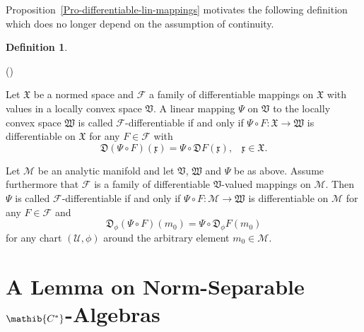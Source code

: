\documentclass[11pt,twoside,openright]{report}
\theoremstyle{definition}
\newtheorem{Def}{Definition}[chapter]
\theoremstyle{plain}
\theoremstyle{remark}
\theoremstyle{assumption}
\newcommand{\Dfrak}{\mathfrak{D}}
\newcommand{\Vfrak}{\mathfrak{V}}
\newcommand{\Wfrak}{\mathfrak{W}}
\newcommand{\Xfrak}{\mathfrak{X}}
\newcommand{\xfrak}{\mathfrak{x}}
\newcommand{\Fscr}{\mathscr{F}}
\newcommand{\Mscr}{\mathscr{M}}
\newcommand{\Uscr}{\mathscr{U}}
\newcounter{defitem}
\newenvironment{deflist}{\begin{list}{(\alph{defitem})}%
  {\usecounter{defitem} \setlength{\topsep}{0ex}%
   \setlength{\parsep}{0.2ex} \setlength{\itemsep}{0.4ex}%
   \setlength{\leftmargin}{0em} \setlength{\itemindent}{0.5em}%
   }}{\end{list}}
\begin{document}
Proposition~\ref{Pro-differentiable-lin-mappings} motivates the
following definition which does no longer depend on the assumption of
continuity.
\begin{Def}
  \label{Def-generalized-diff-lin-mappings}
  \begin{deflist}
  \item Let $\Xfrak$ be a normed space and $\Fscr$ a family of
    differentiable mappings on $\Xfrak$ with values in a locally
    convex space $\Vfrak$. A linear mapping $\Psi$ on $\Vfrak$ to the
    locally convex space $\Wfrak$ is called $\Fscr$-differentiable if
    and only if $\Psi \circ F : \Xfrak \rightarrow \Wfrak$ is
    differentiable on $\Xfrak$ for any $F \in \Fscr$ with 
    \begin{equation*}
      \Dfrak ( \Psi \circ F ) ( \xfrak ) = \Psi \circ \Dfrak F (
      \xfrak ) \text{,} \quad \xfrak \in \Xfrak \text{.}
    \end{equation*}
  \item Let $\Mscr$ be an analytic manifold and let $\Vfrak$, $\Wfrak$
    and $\Psi$ be as above. Assume furthermore that $\Fscr$ is a
    family of differentiable $\Vfrak$-valued mappings on $\Mscr$. Then
    $\Psi$ is called $\Fscr$-differentiable if and only if $\Psi \circ
    F : \Mscr \rightarrow \Wfrak$ is differentiable on $\Mscr$ for any
    $F \in \Fscr$  and 
    \begin{equation*}
      \Dfrak_\phi ( \Psi \circ F ) ( m_0 ) = \Psi \circ \Dfrak_\phi F
      ( m_0 )
    \end{equation*}
    for any chart $( \Uscr , \phi )$ around the arbitrary element $m_0
    \in \Mscr$.
  \end{deflist}
\end{Def}


\chapter[A Lemma on Norm-Separable $\mathib{C^*}$-Algebras]{A Lemma
  on Norm-Separable $\mathib{C^*}$-Algebras}
  \label{chap-separable-algebras}
\end{document}
